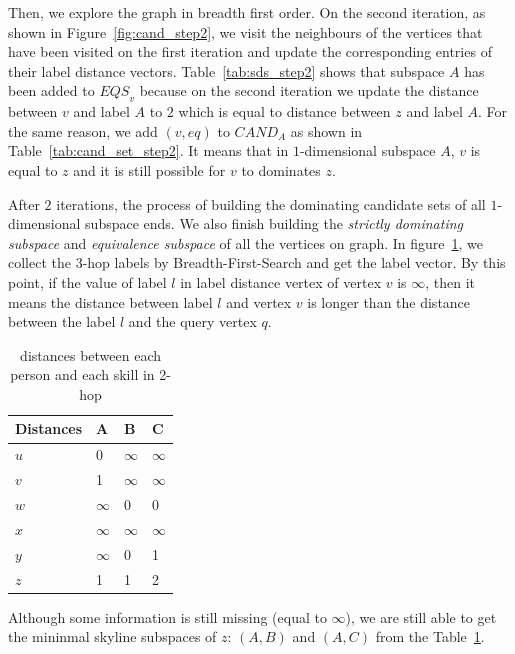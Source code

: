 Then, we explore the graph in breadth first order. On the second iteration, as shown in Figure~\ref{fig:cand_step2}, we visit the neighbours of the vertices that have been visited on the first iteration and update the corresponding entries of their label distance vectors. Table~\ref{tab:sds_step2} shows that subspace $A$ has been added to $\mathit{EQS}_v$ because on the second iteration we update the distance between $v$ and label $A$ to $2$ which is equal to distance between $z$ and label $A$. For the same reason, we add $(v, eq)$ to $\mathit{CAND}_A$ as shown in Table~\ref{tab:cand_set_step2}. It means that in $1$-dimensional subspace $A$, $v$ is equal to $z$ and it is still possible for $v$ to dominates $z$.

After $2$ iterations, the process of building the  dominating candidate sets of all $1$-dimensional subspace ends. We also finish building the \emph{strictly dominating subspace} and \emph{equivalence subspace} of all the vertices on graph. In figure~\ref{tab:d_hops_distance}, we collect the $3$-hop labels by Breadth-First-Search and get the label vector. By this point, if the value of label $l$ in label distance vertex of vertex $v$ is $\infty$, then it means the distance between label $l$ and vertex $v$ is longer than the distance between the label $l$ and the query vertex $q$.

\begin{table}[h]
    \centering
    \begin{tabular}{llll}
    \hline
    Distances & A & B & C \\ \hline
    $u$       & 0 & $\infty$ & $\infty$ \\ \hline
    $v$       & 1 & $\infty$ & $\infty$ \\ \hline
    $w$       & $\infty$ & 0 & 0 \\ \hline
    $x$       & $\infty$ & $\infty$ & $\infty$ \\ \hline
    $y$       & $\infty$ & 0 & 1 \\ \hline
    $z$       & 1 & 1 & 2 \\ \hline
    \end{tabular}
    \caption{\label{font-table} distances between each person and each skill in 2-hop}
    \label{tab:d_hops_distance}
\end{table}

Although some information is still missing (equal to $\infty$), we are still able to get the mininmal skyline subspaces of $z$: $(A, B)$ and $(A, C)$ from the Table~\ref{tab:d_hops_distance}.


